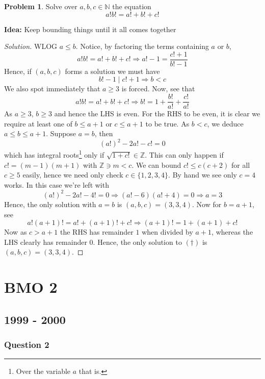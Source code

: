 \documentclass[11pt]{article}
\theoremstyle{definition}
\newtheorem*{problem}{Problem}
\begin{document}
\begin{problem}
  Solve over $a, b, c \in \mathbb{N}$ the equation \[a!b! = a! + b! + c! \tag{$(\dagger)$}\]
\end{problem}

{\bf Idea:} Keep bounding things until it all comes together

\begin{proof}[Solution]
  WLOG $a \leq b$. Notice, by factoring the terms containing $a$ or $b$, 
  \[a!b! = a! + b! + c! \Longrightarrow a! - 1 = \frac{c!+1}{b!-1}\]
  Hence, if $(a,b,c)$ forms a solution we must have 
  \[b! - 1 \; {\Big |} \; c! + 1 \Longrightarrow b < c\]
  We also spot immediately that $a \geq 3$ is forced. Now, see that 
  \[a!b! = a! + b! + c! \Longrightarrow b! = 1 + \frac{b!}{a!} + \frac{c!}{a!}\]
  As $a \geq 3$, $b \geq 3$ and hence the LHS is even. For the RHS to be even, it is clear we require at least one 
  of $b \leq a+1$ or $c \leq a+1$ to be true. As $b < c$, we deduce $a \leq b \leq a + 1$. Suppose $a = b$, 
  then \[(a!)^2 - 2a! - c! = 0\] which has integral roots\footnote{
    Over the variable $a$ that is. 
  } only if $\sqrt{1 + c!} \in \mathbb{Z}$. This can only happen if $c! = (m-1)(m+1)$ with $\mathbb{Z} \ni m < c$. 
  We can bound $c! \leq c(c+2)$ for all $c \geq 5$ easily, hence we need only check $c \in \{1,2,3,4\}$. By hand we 
  see only $c = 4$ works. In this case we're left with 
  \[(a!)^2 - 2a! - 4! = 0 \Longrightarrow (a! - 6)(a! + 4) = 0 \Longrightarrow a = 3\]
  Hence, the only solution with $a = b$ is $(a, b, c) = (3, 3, 4)$. Now for $b = a + 1$, see 
  \[a!(a+1)! = a! + (a + 1)! + c! \Longrightarrow (a+1)! = 1 + (a + 1) + c!\]
  Now as $c > a + 1$ the RHS has remainder $1$ when divided by $a+1$, whereas the LHS clearly has remainder $0$. 
  Hence, the only solution to $(\dagger)$ is $(a,b,c) = (3,3,4)$.
\end{proof}

\newpage

\section{BMO 2}

\subsection{1999 - 2000}

\subsubsection{Question 2}
\end{document}
